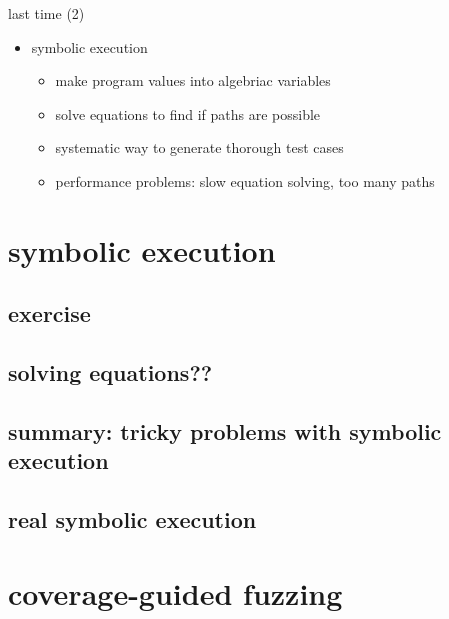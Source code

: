 \begin{frame}{last time (2)}
    \begin{itemize}
    \item symbolic execution
        \begin{itemize}
        \item make program values into algebriac variables
        \item solve equations to find if paths are possible
        \item systematic way to generate thorough test cases
        \item performance problems: slow equation solving, too many paths
        \end{itemize}
    \end{itemize}
\end{frame}

\section{symbolic execution}
\subsection{exercise}


\subsection{solving equations??}

\subsection{summary: tricky problems with symbolic execution}


\subsection{real symbolic execution}


\section{coverage-guided fuzzing}


